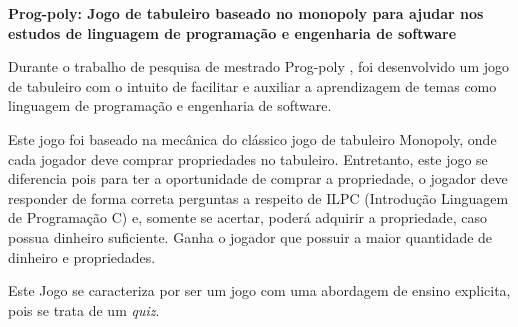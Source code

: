 \item \textbf{Prog-poly: Jogo de tabuleiro baseado no monopoly para ajudar nos estudos de linguagem de programação e engenharia de software}

Durante o trabalho de pesquisa de mestrado Prog-poly \cite{nascimento2022prog},
foi desenvolvido um jogo de tabuleiro com o intuito de facilitar e auxiliar a
aprendizagem de temas como linguagem de programação e engenharia de software.

Este jogo foi baseado na mecânica do clássico jogo de tabuleiro Monopoly, onde
cada jogador deve comprar propriedades no tabuleiro. Entretanto, este jogo se
diferencia pois para ter a oportunidade de comprar a propriedade, o jogador
deve responder de forma correta perguntas a respeito de ILPC (Introdução
Linguagem de Programação C) e, somente se acertar, poderá adquirir a
propriedade, caso possua dinheiro suficiente. Ganha o jogador que possuir a
maior quantidade de dinheiro e propriedades.

Este Jogo se caracteriza por ser um jogo com uma abordagem de ensino explicita, pois se trata de um \emph{quiz}. \cite{nascimento2022prog}


